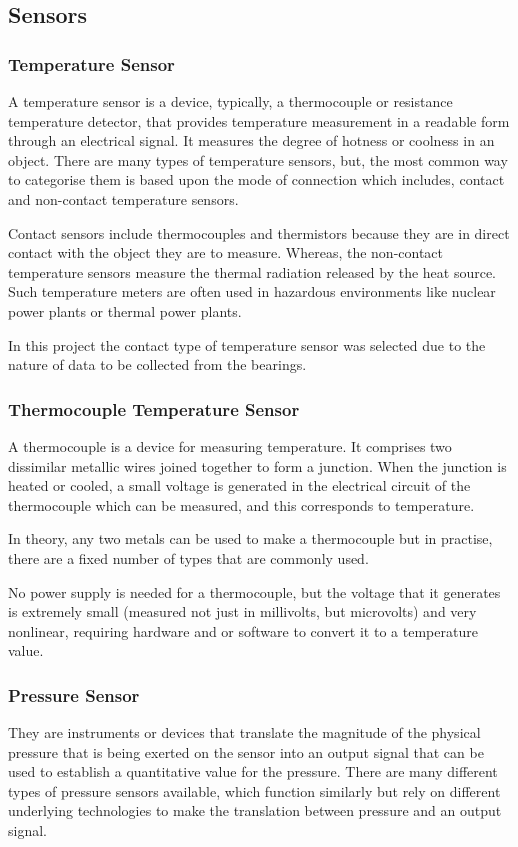 \subsection{Sensors}
\subsubsection{Temperature Sensor}
A temperature sensor is a device, typically, a thermocouple or resistance temperature detector, that provides temperature measurement in a readable form through an electrical signal. It measures the degree of hotness or coolness in an object. There are many types of temperature sensors, but, the most common way to categorise them is based upon the mode of connection which includes, contact and non-contact temperature sensors\cite{noauthor_temperature_2019}. 

Contact sensors include thermocouples and thermistors because they are in direct contact with the object they are to measure. Whereas, the non-contact temperature sensors measure the thermal radiation released by the heat source. Such temperature meters are often used in hazardous environments like nuclear power plants or thermal power plants. 

In this project the contact type of temperature sensor was selected due to the nature of data to be collected from the bearings. 
\subsubsection{Thermocouple Temperature Sensor}
A thermocouple is a device for measuring temperature. It comprises two dissimilar metallic wires joined together to form a junction. When the junction is heated or cooled, a small voltage is generated in the electrical circuit of the thermocouple which can be measured, and this corresponds to temperature. 

In theory, any two metals can be used to make a thermocouple but in practise, there are a fixed number of types that are commonly used.  

No power supply is needed for a thermocouple, but the voltage that it generates is extremely small (measured not just in millivolts, but microvolts) and very nonlinear, requiring hardware and or software to convert it to a temperature value.
\subsubsection{Pressure Sensor}
They are instruments or devices that translate the magnitude of the physical pressure that is being exerted on the sensor into an output signal that can be used to establish a quantitative value for the pressure. There are many different types of pressure sensors available, which function similarly but rely on different underlying technologies to make the translation between pressure and an output signal\cite{noauthor_types_nodate}.  

